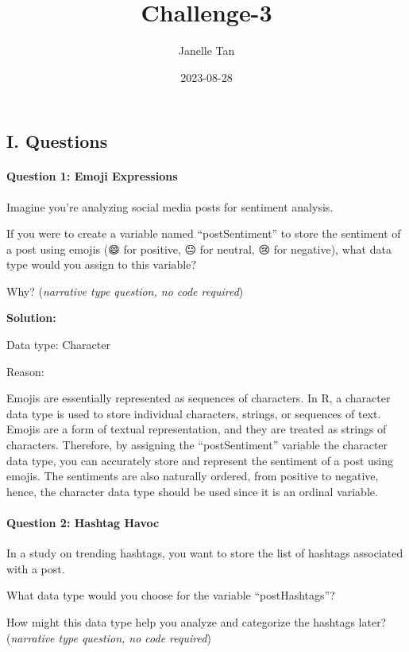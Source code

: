 \documentclass[
]{article}
\title{Challenge-3}
\author{Janelle Tan}
\date{2023-08-28}
\begin{document}
\maketitle

\hypertarget{i.-questions}{%
\subsection{I. Questions}\label{i.-questions}}

\hypertarget{question-1-emoji-expressions}{%
\paragraph{Question 1: Emoji
Expressions}\label{question-1-emoji-expressions}}

Imagine you're analyzing social media posts for sentiment analysis.

If you were to create a variable named ``postSentiment'' to store the
sentiment of a post using emojis (😄 for positive, 😐 for neutral, 😢
for negative), what data type would you assign to this variable?

Why? (\emph{narrative type question, no code required})

\textbf{Solution:}

Data type: Character

Reason:

Emojis are essentially represented as sequences of characters. In R, a
character data type is used to store individual characters, strings, or
sequences of text. Emojis are a form of textual representation, and they
are treated as strings of characters. Therefore, by assigning the
``postSentiment'' variable the character data type, you can accurately
store and represent the sentiment of a post using emojis. The sentiments
are also naturally ordered, from positive to negative, hence, the
character data type should be used since it is an ordinal variable.

\hypertarget{question-2-hashtag-havoc}{%
\paragraph{Question 2: Hashtag Havoc}\label{question-2-hashtag-havoc}}

In a study on trending hashtags, you want to store the list of hashtags
associated with a post.

What data type would you choose for the variable ``postHashtags''?

How might this data type help you analyze and categorize the hashtags
later? (\emph{narrative type question, no code required})
\end{document}
